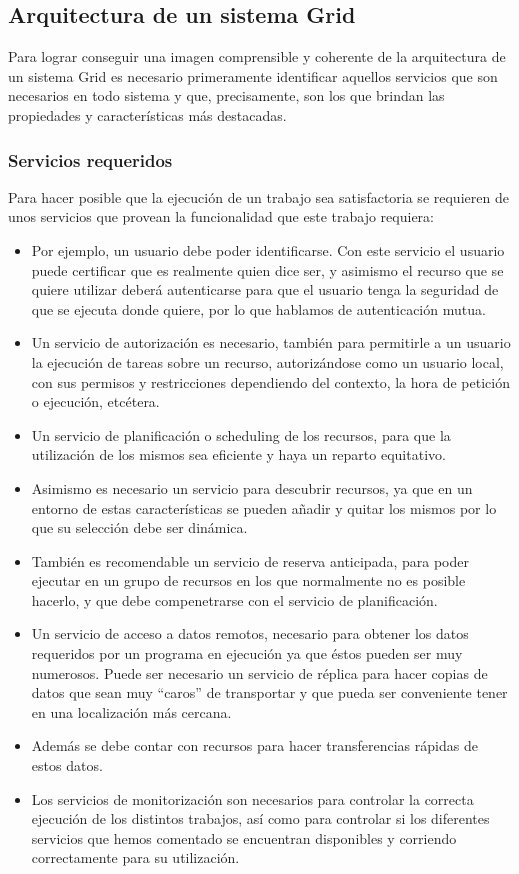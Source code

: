 \subsection{Arquitectura de un sistema Grid}

Para lograr conseguir una imagen comprensible y coherente de la arquitectura de un sistema Grid es necesario primeramente identificar aquellos 
servicios que son necesarios en todo sistema y que, precisamente, son los que brindan las propiedades y características más destacadas.  

\subsubsection{ Servicios requeridos }

Para hacer posible que la ejecución de un trabajo sea satisfactoria se requieren de unos servicios que provean la funcionalidad que este trabajo requiera: 

\begin{itemize}

\item Por ejemplo, un usuario debe poder identificarse. Con este servicio el usuario puede certificar que es realmente quien dice ser, y
 asimismo el recurso que se quiere utilizar deberá autenticarse para que el usuario tenga la seguridad de que se ejecuta donde quiere, por lo que hablamos de autenticación mutua.
\item Un servicio de autorización es necesario, también para permitirle a un usuario la ejecución de tareas sobre un recurso, autorizándose como un usuario local, 
con sus permisos y restricciones dependiendo del contexto, la hora de petición o ejecución, etcétera.
\item Un servicio de planificación o  scheduling de los recursos, para que la utilización de los mismos sea eficiente y haya un reparto equitativo.
\item Asimismo es necesario un servicio para  descubrir recursos, ya que en un entorno de estas características se pueden añadir y quitar los mismos por
 lo que su selección debe ser dinámica.
\item También es recomendable un servicio de reserva anticipada, para poder ejecutar en un grupo de recursos en los que normalmente no es posible hacerlo,
 y que debe compenetrarse con el servicio de planificación.
\item Un servicio de  acceso a datos remotos, necesario para obtener los datos requeridos por un programa en ejecución ya que éstos pueden ser muy numerosos.
 Puede ser necesario un servicio de  réplica  para hacer copias de datos que sean muy “caros” de  transportar y que pueda ser conveniente tener en una localización más cercana.
\item Además se debe contar con recursos para hacer transferencias rápidas de estos datos.
\item Los servicios de  monitorización  son necesarios para controlar la correcta ejecución de los distintos trabajos, así como para controlar si los diferentes 
servicios que hemos comentado se encuentran disponibles y corriendo correctamente para su utilización.

\end{itemize}

